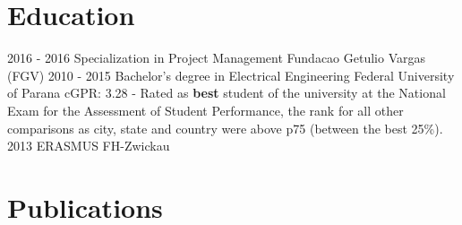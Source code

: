 \documentclass[]{friggeri-cv}
\begin{document}
\section{Education}
\begin{entrylist}
  \entry
    {2016 - 2016}
    {Specialization in Project Management}
    {Fundacao Getulio Vargas (FGV)}
    {}
  \entry
    {2010 - 2015}
    {Bachelor's degree in Electrical Engineering}
    {Federal University of Parana}
    {cGPR: 3.28 - Rated as \textbf{best} student of the university at the National Exam for the Assessment of Student Performance, the rank for all other comparisons as city, state and country were above p75 (between the best 25\%). \\}
  \entry
    {2013}
    {ERASMUS}
    {FH-Zwickau}
    {%
    }
\end{entrylist}

%


\section{Publications}
\end{document}
